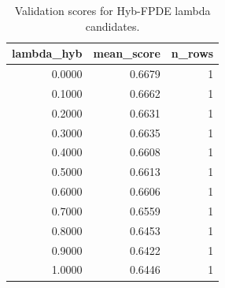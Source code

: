 \begin{table}[t]
\caption{Validation scores for Hyb-FPDE lambda candidates.}
\label{tab:lambda_distribution_computed}
\centering
\begin{tabular}{rrr}
\toprule
lambda\_hyb & mean\_score & n\_rows \\
\midrule
0.0000 & 0.6679 & 1 \\
0.1000 & 0.6662 & 1 \\
0.2000 & 0.6631 & 1 \\
0.3000 & 0.6635 & 1 \\
0.4000 & 0.6608 & 1 \\
0.5000 & 0.6613 & 1 \\
0.6000 & 0.6606 & 1 \\
0.7000 & 0.6559 & 1 \\
0.8000 & 0.6453 & 1 \\
0.9000 & 0.6422 & 1 \\
1.0000 & 0.6446 & 1 \\
\bottomrule
\end{tabular}

\end{table}

